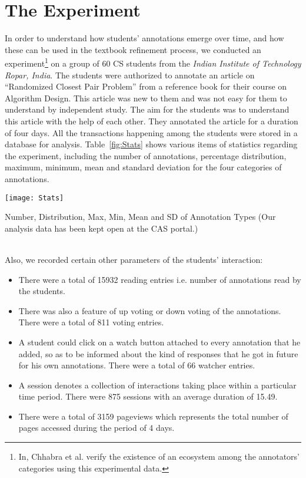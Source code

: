\documentclass{llncs}
\begin{document}
\section{The Experiment}\label{sec:expt}
In order to understand how students' annotations emerge over time, and how these can be used in the textbook refinement process, we conducted an experiment\footnote{In\cite{chhabra2015presence}, Chhabra et al. verify the existence of an ecosystem among the annotators' categories using this experimental data.} on a group of 60 CS students from the \textit{Indian Institute of Technology Ropar, India}. The students were authorized to annotate an article on ``Randomized Closest Pair Problem'' from a reference book\cite{kleinberg2006algorithm} for their course on Algorithm Design. This article was new to them and was not easy for them to understand by independent study. The aim for the students was to understand this article with the help of each other. They annotated the article for a duration of four days. All the transactions 
happening among the students were stored in a database for analysis. 
Table~\ref{fig:Stats} shows various items of statistics regarding the experiment, including the number of annotations, percentage distribution, maximum, minimum, mean and standard deviation for the four categories of annotations.
\begin{table}
\centering  
\texttt{[image: Stats]}
\caption{Number, Distribution, Max, Min, Mean and SD of Annotation Types (Our analysis data has been kept open at the CAS portal.)}
\label{fig:Stats}
\end{table}
\\Also, we recorded certain other parameters of the students' interaction:
\begin{itemize}
\item There were a total of 15932 reading entries i.e. number of annotations read by the students.  
\item There was also a feature of up voting or down voting of the annotations. There were a total of 811 voting entries.
\item A student could click on a watch button attached to every annotation that he added, so as to be informed about the kind of responses that he got in future for his own annotations. There were a total of 66 watcher entries.
\item A session denotes a collection of interactions taking place within a particular time period. There were 875 sessions with an average duration of 15.49.
\item There were a total of 3159 pageviews which represents the total number of pages accessed during the period of 4 days.
\end{itemize}
\end{document}
